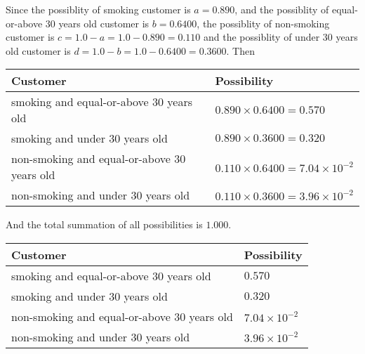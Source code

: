 \documentclass[12pt]{article}
\begin{document}
 
 
 
 
\noindent{}
 
 

Since the possiblity of  %
smoking customer is $ a =  %
0.890 $,
and the possiblity of  %
equal-or-above 30 years old customer is $ b =  %
0.6400 $,
the possiblity of  %
non-smoking customer is $ c = 1.0 - a = 1.0 -
0.890
=  %
0.110 $ and the possiblity of  %
under 30 years old
customer is $ d = 1.0 - b = 1.0 -  %
0.6400 =  %
0.3600  $.
Then
 
\noindent
\begin{tabular}{|l|l|}
\hline
Customer & Possibility \\
\hline
smoking  and  %
equal-or-above 30 years old  &
  $ %
0.890 \times  %
0.6400 =  %
0.570$ \\
\hline
smoking  and  %
under 30 years old &
  $ %
0.890 \times  %
0.3600 =  %
0.320$ \\
\hline
 non-smoking and  %
equal-or-above 30 years old  &
  $ %
0.110 \times  %
0.6400 =  %
7.04 \times 10^{-2}$ \\
\hline
 non-smoking and  %
under 30 years old &
  $ %
0.110 \times  %
0.3600 =  %
3.96 \times 10^{-2}$ \\
\hline
\end{tabular}
 
\noindent
And the total summation of all possibilities is $  %
1.000 $.
 
 
 
 
\noindent{}
 
 

 
 
 
\noindent{}
 
 

 
\noindent
\begin{tabular}{|l|l|}
\hline
Customer & Possibility \\
\hline
smoking  and  %
equal-or-above 30 years old &
  $ %
0.570$ \\
\hline
smoking  and  %
under 30 years old &
  $ %
0.320$ \\
\hline
 non-smoking and  %
equal-or-above 30 years old &
  $ %
7.04 \times 10^{-2}$ \\
\hline
 non-smoking and  %
under 30 years old &
  $ %
3.96 \times 10^{-2}$ \\
\hline
\end{tabular}
 
\end{document}
